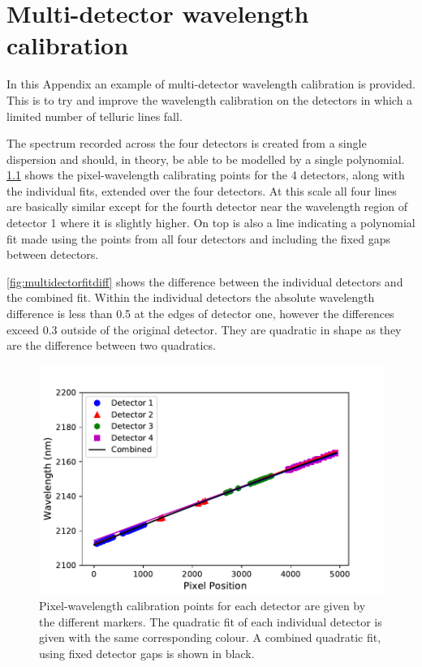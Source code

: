 
\chapter{Multi-detector wavelength calibration} %
\label{appendix:wavelength_fitting}

In this Appendix an example of multi-detector wavelength calibration is provided.
This is to try and improve the wavelength calibration on the detectors in which a limited number of telluric lines fall.

The spectrum recorded across the four detectors is created from a single dispersion and should, in theory, be able to be modelled by a single polynomial.
\cref{fig:multidectorfit} shows the pixel-wavelength calibrating points for the 4 detectors, along with the individual fits, extended over the four detectors.
At this scale all four lines are basically similar except for the fourth detector near the wavelength region of detector 1 where it is slightly higher.
On top is also a line indicating a polynomial fit made using the points from all four detectors and including the fixed gaps between detectors.

\cref{fig:multidectorfitdiff} shows the difference between the individual detectors and the combined fit.
Within the individual detectors the absolute wavelength difference is less than 0.5\nm{} at the edges of detector one, however the differences exceed 0.3\nm{} outside of the original detector.
They are quadratic in shape as they are the difference between two quadratics.

\begin{figure}
    \centering
    \includegraphics[width=0.7\linewidth]{./figures/appendix/combined_wav_fit}
    \caption[Multi-detector fit and difference to individual fits.]{Pixel-wavelength calibration points for each detector are given by the different markers.
    The quadratic fit of each individual detector is given with the same corresponding colour.
    A combined quadratic fit, using fixed detector gaps is shown in black.}
    \label{fig:multidectorfit}
\end{figure}

